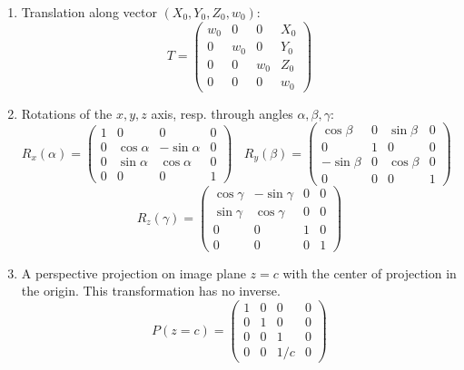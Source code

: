 \documentclass[twoside]{report}
\begin{document}
\begin{enumerate}
\item Translation along vector $(X_0, Y_0, Z_0, w_0)$:
\[
T=\left(\begin{array}{cccc}
w_0&0&0&X_0\\
0&w_0&0&Y_0\\
0&0&w_0&Z_0\\
0&0&0&w_0
\end{array}\right)
\]
\item Rotations of the $x,y,z$ axis, resp. through angles $\alpha,\beta,\gamma$:
\[
R_x(\alpha)=\left(\begin{array}{cccc}
1&0&0&0\\
0&\cos\alpha&-\sin\alpha&0\\
0&\sin\alpha&\cos\alpha&0\\
0&0&0&1
\end{array}\right)~~~~
R_y(\beta)=\left(\begin{array}{cccc}
\cos\beta&0&\sin\beta&0\\
0&1&0&0\\
-\sin\beta&0&\cos\beta&0\\
0&0&0&1
\end{array}\right)~~~~
\]
\[
R_z(\gamma)=\left(\begin{array}{cccc}
\cos\gamma&-\sin\gamma&0&0\\
\sin\gamma&\cos\gamma&0&0\\
0&0&1&0\\
0&0&0&1
\end{array}\right)
\]
\item A perspective projection on image plane $z=c$ with the center of
      projection in the origin. This transformation has no inverse.
\[
P(z=c)=\left(\begin{array}{cccc}
1&0&0&0\\
0&1&0&0\\
0&0&1&0\\
0&0&1/c&0
\end{array}\right)
\]
\end{enumerate}
\end{document}
